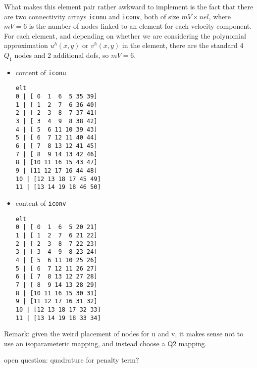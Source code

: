 What makes this element pair rather awkward to implement is the fact that 
there are two connectivity arrays {\tt iconu} and {\tt iconv}, both of size $mV\times nel$, where 
$mV=6$ is the number of nodes linked to an element for each velocity component. 
For each element, and depending on whether we are considering 
the polynomial approximation $u^h(x,y)$ or $v^h(x,y)$ in the element, there are the standard 4 $Q_1$ nodes and 2 additional 
dofs, so $mV=6$.
\begin{itemize}
\item content of {\tt iconu}
\begin{verbatim}
elt
0 | [ 0  1  6  5 35 39]
1 | [ 1  2  7  6 36 40]
2 | [ 2  3  8  7 37 41]
3 | [ 3  4  9  8 38 42]
4 | [ 5  6 11 10 39 43]
5 | [ 6  7 12 11 40 44]
6 | [ 7  8 13 12 41 45]
7 | [ 8  9 14 13 42 46]
8 | [10 11 16 15 43 47]
9 | [11 12 17 16 44 48]
10 | [12 13 18 17 45 49]
11 | [13 14 19 18 46 50]
\end{verbatim}
\item content of {\tt iconv}
\begin{verbatim}
elt
0 | [ 0  1  6  5 20 21]
1 | [ 1  2  7  6 21 22]
2 | [ 2  3  8  7 22 23]
3 | [ 3  4  9  8 23 24]
4 | [ 5  6 11 10 25 26]
5 | [ 6  7 12 11 26 27]
6 | [ 7  8 13 12 27 28]
7 | [ 8  9 14 13 28 29]
8 | [10 11 16 15 30 31]
9 | [11 12 17 16 31 32]
10 | [12 13 18 17 32 33]
11 | [13 14 19 18 33 34]
\end{verbatim}
\end{itemize}

Remark: given the weird placement of nodes for u and v, it makes sense not to 
use an isoparameteric mapping, and instead choose a Q2 mapping.

open question: quadrature for penalty term?
